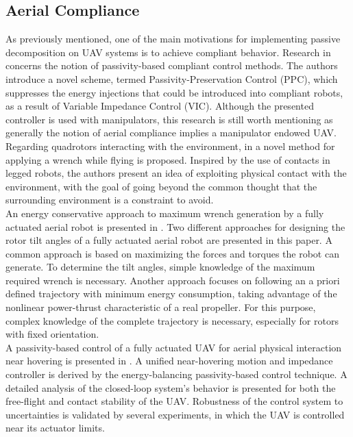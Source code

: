 \subsection{Aerial Compliance}
As previously mentioned, one of the main motivations for implementing passive decomposition on UAV systems is to achieve compliant behavior. Research in \cite{passive-variable-impedance-compliant} concerns the notion of passivity-based compliant control methods. The authors introduce a novel scheme, termed Passivity-Preservation Control (PPC), which suppresses the energy injections that could be introduced into compliant robots, as a result of Variable Impedance Control (VIC). Although the presented controller is used with manipulators, this research is still worth mentioning as generally the notion of aerial compliance implies a manipulator endowed UAV. \\
Regarding quadrotors interacting with the environment, in \cite{quadrotor-itneraction-environment} a novel method for applying a wrench while flying is proposed. Inspired by the use of contacts in legged robots, the authors present an idea of exploiting physical contact with the environment, with the goal of going beyond the common thought that the surrounding environment is a constraint to avoid. \\
An energy conservative approach to maximum wrench generation by a fully actuated aerial robot is presented in \cite{max-wrench-min-energy}. Two different approaches for designing the rotor tilt angles of a fully actuated aerial robot are presented in this paper. A common approach is based on maximizing the forces and torques the robot can generate. To determine the tilt angles, simple knowledge of the maximum required wrench is necessary. Another approach focuses on following an a priori defined trajectory with minimum energy consumption, taking advantage of the nonlinear power-thrust characteristic of a real propeller. For this purpose, complex knowledge of the complete trajectory is necessary, especially for rotors with fixed orientation.   \\
A passivity-based control of a fully actuated UAV for aerial physical interaction near hovering is presented in \cite{passivity-based-physical-interaction}. A unified near-hovering motion and impedance controller is derived by the energy-balancing passivity-based control technique. A detailed analysis of the closed-loop system’s behavior  is presented for both the free-flight and contact stability of the UAV. Robustness of the control system to uncertainties is validated by several experiments, in which the UAV is controlled near its actuator limits.

